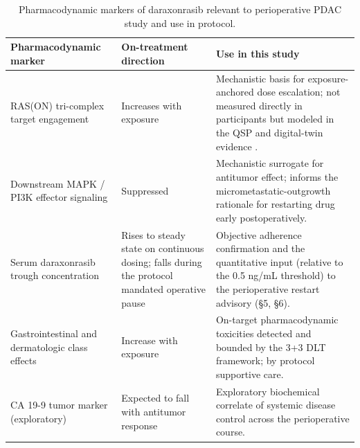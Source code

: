\begin{table}[t]
\centering
\caption{Pharmacodynamic markers of daraxonrasib relevant to perioperative
PDAC study and use in protocol.}
\label{tab:sec07-pd}
\begin{tabularx}{\textwidth}{L{3.7cm} L{4.4cm} Y}
\toprule
\textbf{Pharmacodynamic marker} & \textbf{On-treatment direction} & \textbf{Use in this study} \\
\midrule
RAS(ON) tri-complex target engagement & Increases with exposure & Mechanistic basis for exposure-anchored dose escalation; not measured directly in participants but modeled in the QSP and digital-twin evidence \cite{qspmetpancre}. \\
Downstream MAPK / PI3K effector signaling & Suppressed & Mechanistic surrogate for antitumor effect; informs the micrometastatic-outgrowth rationale for restarting drug early postoperatively. \\
Serum daraxonrasib trough concentration & Rises to steady state on continuous dosing; falls during the protocol mandated operative pause & Objective adherence confirmation and the quantitative input (relative to the 0.5 ng/mL threshold) to the perioperative restart advisory (\S 5, \S 6). \\
Gastrointestinal and dermatologic class effects & Increase with exposure & On-target pharmacodynamic toxicities detected and bounded by the 3+3 DLT framework; by protocol supportive care. \\
CA 19-9 tumor marker (exploratory) & Expected to fall with antitumor response & Exploratory biochemical correlate of systemic disease control across the perioperative course. \\
\bottomrule
\end{tabularx}
\end{table}
\vspace*{-1.245cm}

